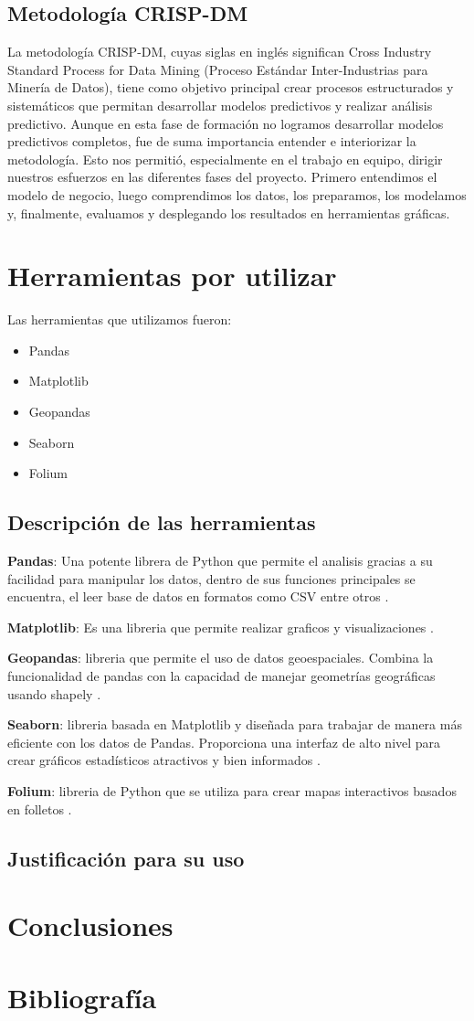 \documentclass[12pt,a4paper]{article}
\begin{document}
\subsection{Metodología CRISP-DM}
La metodología CRISP-DM, cuyas siglas en inglés significan Cross Industry Standard Process for Data Mining (Proceso Estándar Inter-Industrias para Minería de Datos), tiene como objetivo principal crear procesos estructurados y sistemáticos que permitan desarrollar modelos predictivos y realizar análisis predictivo. Aunque en esta fase de formación no logramos desarrollar modelos predictivos completos, fue de suma importancia entender e interiorizar la metodología. Esto nos permitió, especialmente en el trabajo en equipo, dirigir nuestros esfuerzos en las diferentes fases del proyecto. Primero entendimos el modelo de negocio, luego comprendimos los datos, los preparamos, los modelamos y, finalmente, evaluamos y desplegando los resultados en herramientas gráficas.
\section{Herramientas por utilizar}
Las herramientas que utilizamos fueron:
\begin{itemize}
	\item Pandas
	\item Matplotlib
	\item Geopandas
	\item Seaborn
	\item Folium
\end{itemize}
\subsection{Descripción de las herramientas}
\textbf{Pandas}: Una potente librera de Python que permite el analisis gracias a su facilidad para manipular los datos, dentro de sus funciones principales se encuentra, el leer base de datos en formatos como CSV entre otros \citep{reback2020pandas}.

\textbf{Matplotlib}: Es una libreria que permite realizar graficos y visualizaciones \citep{Hunter:2007}.

\textbf{Geopandas}: libreria que permite el uso de datos geoespaciales. Combina la funcionalidad de pandas con la capacidad de manejar geometrías geográficas usando shapely \citep{kelsey_jordahl_2020_3946761}.

\textbf{Seaborn}: libreria basada en Matplotlib y diseñada para trabajar de manera más eficiente con los datos de Pandas. Proporciona una interfaz de alto nivel para crear gráficos estadísticos atractivos y bien informados \citep{Waskom2021}.

\textbf{Folium}: libreria de Python que se utiliza para crear mapas interactivos basados en folletos \citep{folium}.
\subsection{Justificación para su uso}
\section{Conclusiones}
\newpage
\section{Bibliografía}

     
\end{document}
